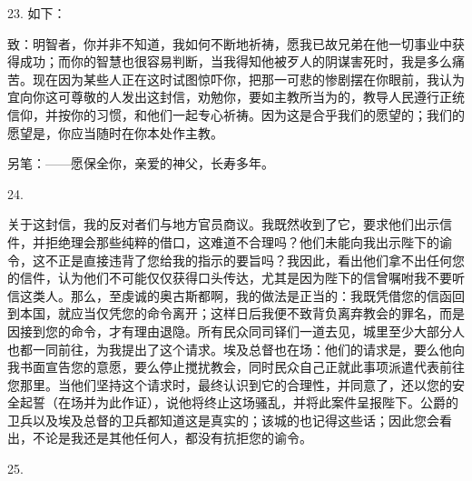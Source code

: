 23. 如下：\par

致：明智者，你并非不知道，我如何不断地祈祷，愿我已故兄弟在他一切事业中获得成功；而你的智慧也很容易判断，当我得知他被歹人的阴谋害死时，我是多么痛苦。现在因为某些人正在这时试图惊吓你，把那一可悲的惨剧摆在你眼前，我认为宜向你这可尊敬的人发出这封信，劝勉你，要如主教所当为的，教导人民遵行正统信仰，并按你的习惯，和他们一起专心祈祷。因为这是合乎我们的愿望的；我们的愿望是，你应当随时在你本处作主教。\par

另笔：——愿保全你，亲爱的神父，长寿多年。\par

24. \par

关于这封信，我的反对者们与地方官员商议。我既然收到了它，要求他们出示信件，并拒绝理会那些纯粹的借口，这难道不合理吗？他们未能向我出示陛下的谕令，这不正是直接违背了您给我的指示的要旨吗？我因此，看出他们拿不出任何您的信件，认为他们不可能仅仅获得口头传达，尤其是因为陛下的信曾嘱咐我不要听信这类人。那么，至虔诚的奥古斯都啊，我的做法是正当的：我既凭借您的信函回到本国，就应当仅凭您的命令离开；这样日后我便不致背负离弃教会的罪名，而是因接到您的命令，才有理由退隐。所有民众同司铎们一道去见，城里至少大部分人也都一同前往，为我提出了这个请求。埃及总督也在场：他们的请求是，要么他向我书面宣告您的意愿，要么停止搅扰教会，同时民众自己正就此事项派遣代表前往您那里。当他们坚持这个请求时，最终认识到它的合理性，并同意了，还以您的安全起誓（在场并为此作证），说他将终止这场骚乱，并将此案件呈报陛下。公爵的卫兵以及埃及总督的卫兵都知道这是真实的；该城的也记得这些话；因此您会看出，不论是我还是其他任何人，都没有抗拒您的谕令。\par

25. \par

